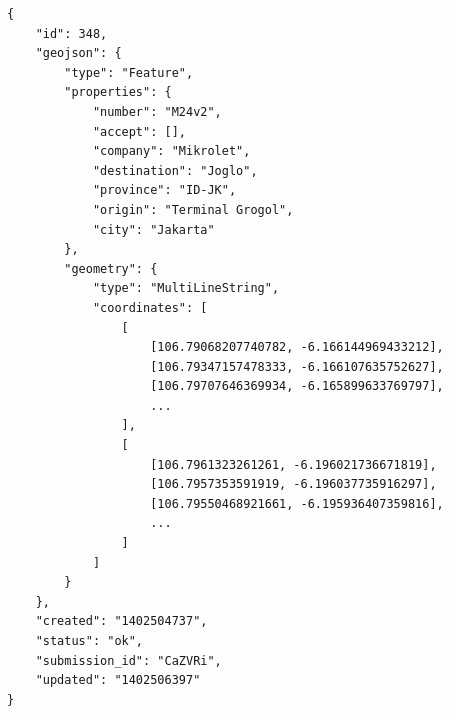 \begin{lstlisting}
{
	"id": 348,
	"geojson": {
		"type": "Feature",
		"properties": {
			"number": "M24v2",
			"accept": [],
			"company": "Mikrolet",
			"destination": "Joglo",
			"province": "ID-JK",
			"origin": "Terminal Grogol",
			"city": "Jakarta"
		},
		"geometry": {
			"type": "MultiLineString",
			"coordinates": [
				[
					[106.79068207740782, -6.166144969433212],
					[106.79347157478333, -6.166107635752627],
					[106.79707646369934, -6.165899633769797],
					...
				],
				[
					[106.7961323261261, -6.196021736671819],
					[106.7957353591919, -6.196037735916297],
					[106.79550468921661, -6.195936407359816],
					...
				]
			]
		}
	},
	"created": "1402504737",
	"status": "ok",
	"submission_id": "CaZVRi",
	"updated": "1402506397"
}
\end{lstlisting}
